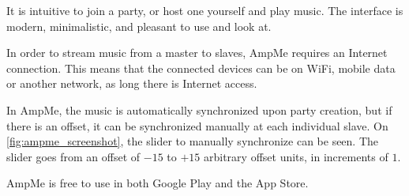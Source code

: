 It is intuitive to join a party, or host one yourself and play music.
The interface is modern, minimalistic, and pleasant to use and look at.

In order to stream music from a master to slaves, AmpMe requires an Internet connection.
This means that the connected devices can be on WiFi, mobile data or another network, as long there is Internet access.

In AmpMe, the music is automatically synchronized upon party creation, but if there is an offset, it can be synchronized manually at each individual slave.
On \cref{fig:ampme_screenshot}, the slider to manually synchronize can be seen.
The slider goes from an offset of $-15$ to $+15$ arbitrary offset units, in increments of $1$.

AmpMe is free to use in both Google Play and the App Store.\cite{amp_faq, amp_play, amp_itunes}

